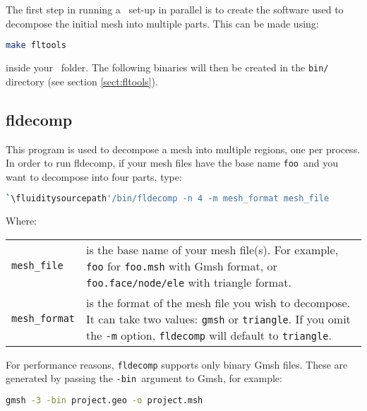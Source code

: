 The first step in running a \fluidity\ set-up in parallel is to create the software
used to decompose the initial mesh into multiple parts. This can be made using:
\begin{lstlisting}[language=bash]
make fltools
\end{lstlisting}
inside your \fluidity\ folder. The following binaries will then be created in the \lstinline+bin/+ directory (see section \ref{sect:fltools}).



\subsection{fldecomp}
\label{mesh!meshing tools!fldecomp}
This program is used to decompose a mesh into multiple regions, one per
process. In order to run fldecomp, if your mesh files have the base name
\lstinline{foo}\ and you want to decompose into four parts, type:
\begin{lstlisting}[language = Bash]
`\fluiditysourcepath'/bin/fldecomp -n 4 -m mesh_format mesh_file
\end{lstlisting}

Where:
\begin{center}
  \begin{tabular}{lp{}}
    \lstinline+mesh_file+ & is the base name of your mesh file(s). For
    example, \lstinline+foo+ for \lstinline+foo.msh+ with Gmsh format, or
    \lstinline+foo.face/node/ele+ with triangle format.\\
    \lstinline+mesh_format+ & is the format of the mesh file you wish to
    decompose. It can take two values: \lstinline+gmsh+ or
    \lstinline+triangle+. If you omit the \lstinline+-m+ option,
    \lstinline+fldecomp+ will default to \lstinline+triangle+.
  \end{tabular}
\end{center}

For performance reasons, \lstinline[language=Bash]{fldecomp} supports only
binary Gmsh files. These are generated by passing the \lstinline{-bin}\
argument to Gmsh, for example:

\begin{lstlisting}[language=bash]
gmsh -3 -bin project.geo -o project.msh
\end{lstlisting}


